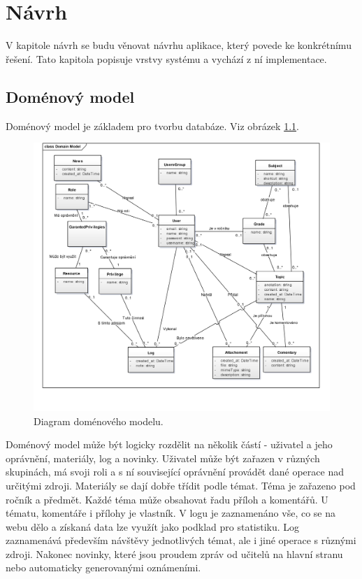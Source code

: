 \documentclass[thesis=B,czech]{FITthesis}[2012/06/26]
\begin{document}

\chapter{Návrh}
V kapitole návrh se budu věnovat návrhu aplikace, který povede ke konkrétnímu řešení. Tato kapitola popisuje vrstvy systému a vychází z ní implementace.

\section{Doménový model}

Doménový model je základem pro tvorbu databáze. Viz obrázek \ref{fig:domainmodel}.

\begin{figure}
  \centering
	\includegraphics[scale=0.8]{domain_model.png}
	\caption{Diagram doménového modelu.} \label{fig:domainmodel} 
\end{figure}

\begin{center}
\end{center}

Doménový model může být logicky rozdělit na několik částí - uživatel a jeho oprávnění, materiály, log a novinky. Uživatel může být zařazen v různých skupinách, má svoji roli a s ní související oprávnění provádět dané operace nad určitými zdroji. Materiály se dají dobře třídit podle témat. Téma je zařazeno pod ročník a předmět. Každé téma může obsahovat řadu příloh a komentářů. U tématu, komentáře i přílohy je vlastník. V logu je zaznamenáno vše, co se na webu dělo a získaná data lze využít jako podklad pro statistiku. Log zaznamenává především návštěvy jednotlivých témat, ale i jiné operace s různými zdroji. Nakonec novinky, které jsou proudem zpráv od učitelů na hlavní stranu nebo automaticky generovanými oznámeními.
\end{document}
